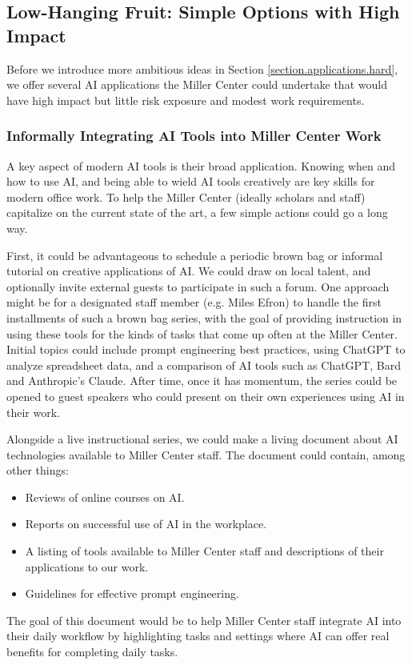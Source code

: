 \documentclass[12pt, oneside]{article}   	%
\begin{document}
\subsection{Low-Hanging Fruit: Simple Options with High Impact}\label{section.applications.easy}
Before we introduce more ambitious ideas in Section \ref{section.applications.hard}, we offer several AI applications the Miller Center could undertake that would have high impact but little risk exposure and modest work requirements.  

\subsubsection{Informally Integrating AI Tools into Miller Center Work}\label{section.application.easy.daily-work} 
A key aspect of modern AI tools is their broad application.  Knowing when and how to use AI, and being able to wield AI tools creatively are key skills for modern office work.  To help the Miller Center (ideally scholars and staff) capitalize on the current state of the art, a few simple actions could go a long way.

First, it could be advantageous to schedule a periodic brown bag or informal tutorial on creative applications of AI.  We could draw on local talent, and optionally invite external guests to participate in such a forum.  One approach might be for a designated staff member (e.g. Miles Efron) to handle  the first installments of such a brown bag series, with the goal of providing instruction in using these tools for the kinds of tasks that come up often at the Miller Center.  
 Initial topics could include prompt engineering best practices, using ChatGPT to analyze spreadsheet data, and a comparison of AI tools such as ChatGPT, Bard and Anthropic's Claude.  After time, once it has momentum, the series could be opened to guest speakers who could present on their own experiences using AI in their work.

Alongside a live instructional series, we could make a living document about AI technologies available to Miller Center staff.  The document could contain, among other things:
\begin{itemize}
\item Reviews of online courses on AI.  
\item Reports on successful use of AI in the workplace.
\item A listing of tools available to Miller Center staff and descriptions of their applications to our work.
\item Guidelines for effective prompt engineering.
\end{itemize}
The goal of this document would be to help Miller Center staff integrate AI into their daily workflow by highlighting tasks and settings where AI can offer real benefits for completing daily tasks.
\end{document}

